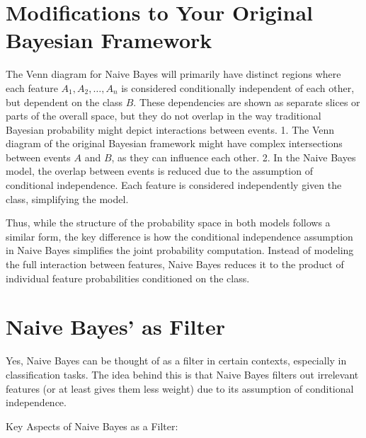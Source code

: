 \documentclass[
  12 pt,
  a4paper,
]{book}
\numberwithin{equation}{section}
\theoremstyle{plain}      %
\theoremstyle{definition} %
\theoremstyle{remark}     %
\theoremstyle{note}         %
\begin{document}
\hypertarget{modifications-to-your-original-bayesian-framework}{%
\section{Modifications to Your Original Bayesian
Framework}\label{modifications-to-your-original-bayesian-framework}}

The Venn diagram for Naive Bayes will primarily have distinct regions
where each feature \(A_1, A_2, \ldots, A_n\) is considered conditionally
independent of each other, but dependent on the class \(B\). These
dependencies are shown as separate slices or parts of the overall space,
but they do not overlap in the way traditional Bayesian probability
might depict interactions between events. 1. The Venn diagram of the
original Bayesian framework might have complex intersections between
events \(A\) and \(B\), as they can influence each other. 2. In the
Naive Bayes model, the overlap between events is reduced due to the
assumption of conditional independence. Each feature is considered
independently given the class, simplifying the model.

Thus, while the structure of the probability space in both models
follows a similar form, the key difference is how the conditional
independence assumption in Naive Bayes simplifies the joint probability
computation. Instead of modeling the full interaction between features,
Naive Bayes reduces it to the product of individual feature
probabilities conditioned on the class.

\hypertarget{naive-bayes-as-filter}{%
\section{Naive Bayes' as Filter}\label{naive-bayes-as-filter}}

Yes, Naive Bayes can be thought of as a filter in certain contexts,
especially in classification tasks. The idea behind this is that Naive
Bayes filters out irrelevant features (or at least gives them less
weight) due to its assumption of conditional independence.

Key Aspects of Naive Bayes as a Filter:
\end{document}
